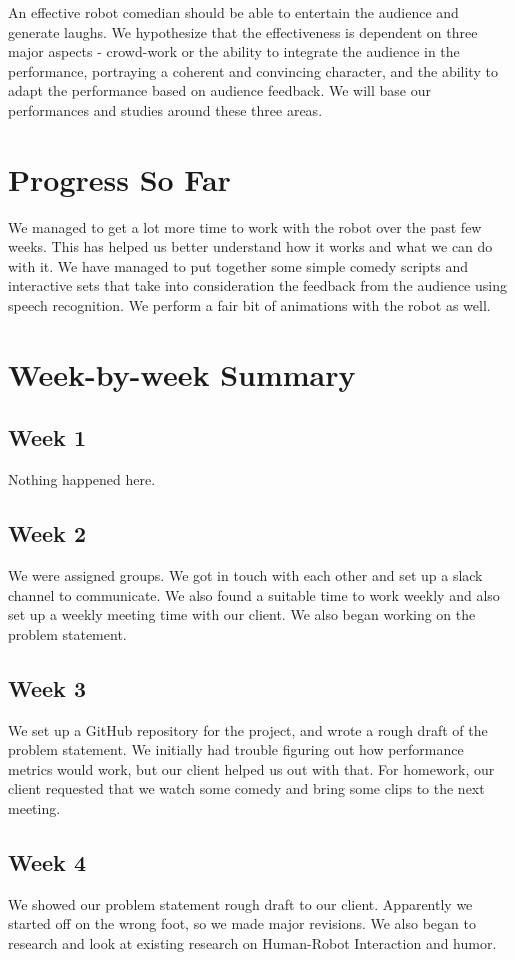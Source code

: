 \documentclass[onecolumn, draftclsnofoot,10pt, compsoc]{IEEEtran}
\begin{document}
An effective robot comedian should be able to entertain the audience and generate laughs. We hypothesize that the effectiveness is dependent on three major aspects - crowd-work or the ability to integrate the audience in the performance, portraying a coherent and convincing character, and the ability to adapt the performance based on audience feedback. We will base our performances and studies around these three areas.

\section{Progress So Far}
We managed to get a lot more time to work with the robot over the past few weeks. This has helped us better understand how it works and what we can do with it.
We have managed to put together some simple comedy scripts and interactive sets that take into consideration the feedback from the audience using speech recognition. We perform a fair bit of animations with the robot as well.

\section{Week-by-week Summary}


\subsection{Week 1}
Nothing happened here.
\subsection{Week 2}
We were assigned groups. We got in touch with each other and set up a slack channel to communicate. We also found a suitable time to work weekly and also set up a weekly meeting time with our client. We also began working on the problem statement.
\subsection{Week 3}
We set up a GitHub repository for the project, and wrote a rough draft of the problem statement. We initially had trouble figuring out how performance metrics would work, but our client helped us out with that. For homework, our client requested that we watch some comedy and bring some clips to the next meeting.
\subsection{Week 4}
We showed our problem statement rough draft to our client. Apparently we started off on the wrong foot, so we made major revisions. We also began to research and look at existing research on Human-Robot Interaction and humor.
\end{document}
